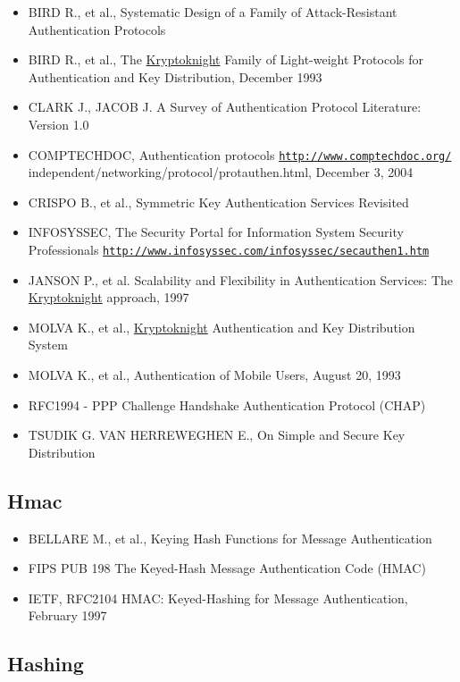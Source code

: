 \begin{itemize}
\item BIRD R., et al., Systematic Design of a Family of Attack-Resistant Authentication Protocols \item BIRD R., et al., The \hyperlink{class_kryptoknight}{Kryptoknight} Family of Light-weight Protocols for Authentication and Key Distribution, December 1993 \item CLARK J., JACOB J. A Survey of Authentication Protocol Literature: Version 1.0 \item COMPTECHDOC, Authentication protocols \href{http://www.comptechdoc.org/}{\tt http://www.comptechdoc.org/} independent/networking/protocol/protauthen.html, December 3, 2004 \item CRISPO B., et al., Symmetric Key Authentication Services Revisited \item INFOSYSSEC, The Security Portal for Information System Security Professionals \href{http://www.infosyssec.com/infosyssec/secauthen1.htm}{\tt http://www.infosyssec.com/infosyssec/secauthen1.htm} \item JANSON P., et al. Scalability and Flexibility in Authentication Services: The \hyperlink{class_kryptoknight}{Kryptoknight} approach, 1997 \item MOLVA K., et al., \hyperlink{class_kryptoknight}{Kryptoknight} Authentication and Key Distribution System \item MOLVA K., et al., Authentication of Mobile Users, August 20, 1993 \item RFC1994 - PPP Challenge Handshake Authentication Protocol (CHAP) \item TSUDIK G. VAN HERREWEGHEN E., On Simple and Secure Key Distribution\end{itemize}
\hypertarget{main_Hmac}{}\subsection{Hmac}\label{main_Hmac}
\begin{itemize}
\item BELLARE M., et al., Keying Hash Functions for Message Authentication \item FIPS PUB 198 The Keyed-Hash Message Authentication Code (HMAC) \item IETF, RFC2104 HMAC: Keyed-Hashing for Message Authentication, February 1997\end{itemize}
\hypertarget{main_Hashing}{}\subsection{Hashing}\label{main_Hashing}
